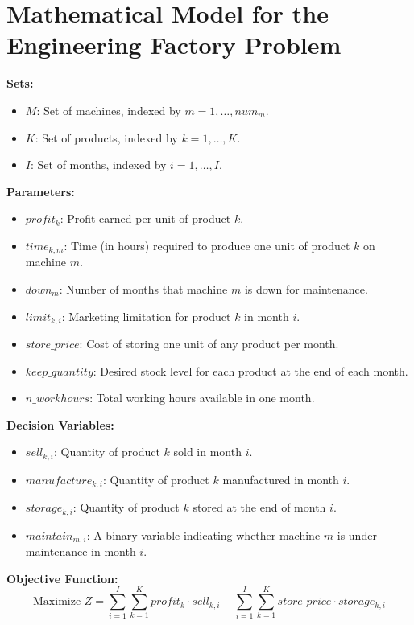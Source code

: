 \documentclass{article}
\begin{document}
\section*{Mathematical Model for the Engineering Factory Problem}

\textbf{Sets:}
\begin{itemize}
    \item $M$: Set of machines, indexed by $m = 1, \ldots, num_m$.
    \item $K$: Set of products, indexed by $k = 1, \ldots, K$.
    \item $I$: Set of months, indexed by $i = 1, \ldots, I$.
\end{itemize}

\textbf{Parameters:}
\begin{itemize}
    \item $profit_k$: Profit earned per unit of product $k$.
    \item $time_{k,m}$: Time (in hours) required to produce one unit of product $k$ on machine $m$.
    \item $down_m$: Number of months that machine $m$ is down for maintenance.
    \item $limit_{k,i}$: Marketing limitation for product $k$ in month $i$.
    \item $store\_price$: Cost of storing one unit of any product per month.
    \item $keep\_quantity$: Desired stock level for each product at the end of each month.
    \item $n\_workhours$: Total working hours available in one month.
\end{itemize}

\textbf{Decision Variables:}
\begin{itemize}
    \item $sell_{k,i}$: Quantity of product $k$ sold in month $i$.
    \item $manufacture_{k,i}$: Quantity of product $k$ manufactured in month $i$.
    \item $storage_{k,i}$: Quantity of product $k$ stored at the end of month $i$.
    \item $maintain_{m,i}$: A binary variable indicating whether machine $m$ is under maintenance in month $i$.
\end{itemize}

\textbf{Objective Function:}
\[
\text{Maximize } Z = \sum_{i=1}^{I} \sum_{k=1}^{K} profit_k \cdot sell_{k,i} - \sum_{i=1}^{I} \sum_{k=1}^{K} store\_price \cdot storage_{k,i}
\]
\end{document}
